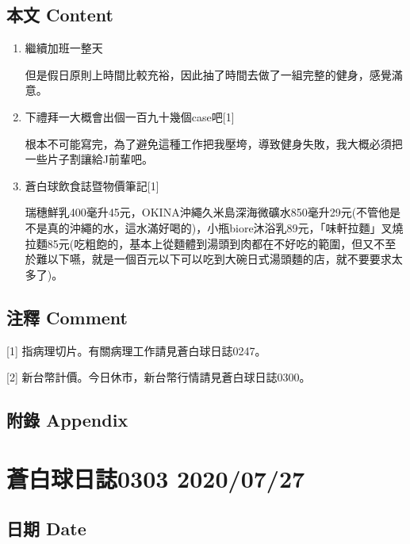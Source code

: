 \documentclass[a5paper, 11pt
]{book}
\begin{document}
\hypertarget{ux672cux6587-content-48}{%
\subsection{本文 Content}\label{ux672cux6587-content-48}}

\begin{enumerate}
\def\labelenumi{\arabic{enumi}.}
\item
  繼續加班一整天

  但是假日原則上時間比較充裕，因此抽了時間去做了一組完整的健身，感覺滿意。
\item
  下禮拜一大概會出個一百九十幾個case吧{[}1{]}

  根本不可能寫完，為了避免這種工作把我壓垮，導致健身失敗，我大概必須把一些片子割讓給J前輩吧。
\item
  蒼白球飲食誌暨物價筆記{[}1{]}

  瑞穗鮮乳400毫升45元，OKINA沖繩久米島深海微礦水850毫升29元(不管他是不是真的沖繩的水，這水滿好喝的)，小瓶biore沐浴乳89元，「味軒拉麵」叉燒拉麵85元(吃粗飽的，基本上從麵體到湯頭到肉都在不好吃的範圍，但又不至於難以下嚥，就是一個百元以下可以吃到大碗日式湯頭麵的店，就不要要求太多了)。
\end{enumerate}

\hypertarget{ux6ce8ux91cb-comment-48}{%
\subsection{注釋 Comment}\label{ux6ce8ux91cb-comment-48}}

{[}1{]} 指病理切片。有關病理工作請見蒼白球日誌0247。

{[}2{]} 新台幣計價。今日休市，新台幣行情請見蒼白球日誌0300。

\hypertarget{ux9644ux9304-appendix-48}{%
\subsection{附錄 Appendix}\label{ux9644ux9304-appendix-48}}

\hypertarget{ux84bcux767dux7403ux65e5ux8a8c0303-20200727}{%
\section{蒼白球日誌0303
2020/07/27}\label{ux84bcux767dux7403ux65e5ux8a8c0303-20200727}}

\hypertarget{ux65e5ux671f-date-49}{%
\subsection{日期 Date}\label{ux65e5ux671f-date-49}}
\end{document}
